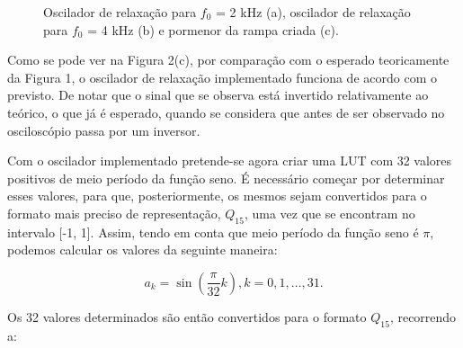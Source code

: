 \documentclass[11pt]{article}
\numberwithin{equation}{section}
\begin{document}
\begin{figure}[H]
	\linebreak
	\vspace{-0.8em}
	\caption{Oscilador de relaxação para $f_{0}$ = 2 kHz (a), oscilador de relaxação para $f_{0}$ = 4 kHz (b) e pormenor da rampa criada (c).}
	\vspace{-0.8em}
\end{figure}

Como se pode ver na Figura 2(c), por comparação com o esperado teoricamente da Figura 1, o oscilador de relaxação implementado funciona de acordo com o previsto. De notar que o sinal que se observa está invertido relativamente ao teórico, o que já é esperado, quando se considera que antes de ser observado no osciloscópio passa por um inversor.

Com o oscilador implementado pretende-se agora criar uma LUT com 32 valores positivos de meio período da função seno. É necessário começar por determinar esses valores, para que, posteriormente, os mesmos sejam convertidos para o formato mais preciso de representação, $Q_{15}$, uma vez que se encontram no intervalo [-1, 1]. Assim, tendo em conta que meio período da função seno é $\pi$, podemos calcular os valores da seguinte maneira:

\vspace{-3mm}
\begin{equation}
a_{k} = \sin \left( \frac{\pi}{32}k \right), k = 0, 1, \ldots, 31.
\end{equation}

\vspace{1mm}
Os 32 valores determinados são então convertidos para o formato $Q_{15}$, recorrendo a:
\end{document}
